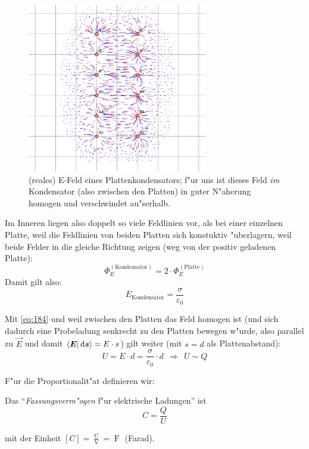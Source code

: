 \begin{figure}[h]
   \centering
   \includegraphics[width=0.7\textwidth]{bilder/efeld_kondensator}
   \caption[E-Feld im Plattenkondensator]{(reales) E-Feld eines
     Plattenkondensators; f"ur uns ist dieses Feld \emph{im}
     Kondensator (also zwischen den Platten) in guter N"aherung
     homogen und verschwindet au"serhalb.}
   \label{abb_efeld-plattenkondensator}
\end{figure}
Im Inneren liegen also doppelt so viele Feldlinien vor, als bei einer
einzelnen Platte, weil die Feldlinien von beiden Platten sich
konstuktiv "uberlagern, weil beide Felder in die gleiche Richtung
zeigen (weg von der positiv geladenen Platte):
\begin{equation}
   \label{eq:199}
   \Phi_E^{(\text{Kondensator})} = 2 \cdot \Phi_E^{(\text{Platte})}
\end{equation}
Damit gilt also:
\begin{equation}
   \label{eqn_differenz-c01}
   \boxed{
E_\text{Kondensator} = \frac{\sigma}{\varepsilon_0}
}
\end{equation}


\abs
Mit \eqref{eq:184} und weil zwischen den Platten das Feld homogen ist
(und sich dadurch eine Probeladung senkrecht zu den Platten bewegen
w"urde, also parallel zu $\vec E$ und damit $\langle \boldsymbol{E} | \, \mathrm{d}
\boldsymbol{s}  \rangle = E \cdot s$) gilt weiter (mit $s = d$ als Plattenabstand):
\begin{equation}
   \label{eqn_differenz-c02}
   U = E \cdot d = \frac{\sigma}{\varepsilon_0} \cdot d ~ ~
   \Rightarrow ~ ~
U \sim Q
\end{equation}

F"ur die Proportionalit"at definieren wir:
\begin{Def}
Das "`\emph{Fassungsverm"ogen} f"ur elektrische Ladungen"' ist
\begin{equation}
   \label{eqn_differenz-c04}
   C = \frac{Q}{U}
\end{equation}
\end{Def}
mit der Einheit $[C] = \frac{\operatorname{C}}{\operatorname{V}} =
\operatorname{F}$ (Farad).

